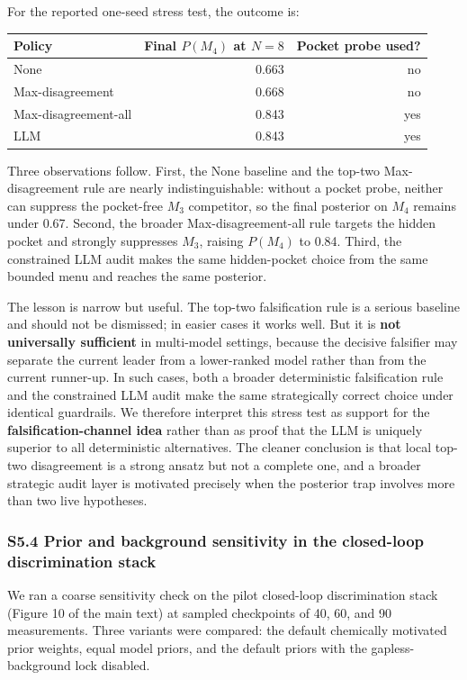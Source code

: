\documentclass[
]{article}
\begin{document}
For the reported one-seed stress test, the outcome is:

\begin{longtable}[]{@{}lrr@{}}
\toprule
\textbf{Policy} & \textbf{Final \(P(M_4)\) at \(N=8\)} & \textbf{Pocket
probe used?}\tabularnewline
\midrule
\endhead
None & 0.663 & no\tabularnewline
Max-disagreement & 0.668 & no\tabularnewline
Max-disagreement-all & 0.843 & yes\tabularnewline
LLM & 0.843 & yes\tabularnewline
\bottomrule
\end{longtable}

Three observations follow. First, the None baseline and the top-two
Max-disagreement rule are nearly indistinguishable: without a pocket
probe, neither can suppress the pocket-free \(M_3\) competitor, so the
final posterior on \(M_4\) remains under 0.67. Second, the broader
Max-disagreement-all rule targets the hidden pocket and strongly
suppresses \(M_3\), raising \(P(M_4)\) to 0.84. Third, the constrained
LLM audit makes the same hidden-pocket choice from the same bounded menu
and reaches the same posterior.

The lesson is narrow but useful. The top-two falsification rule is a
serious baseline and should not be dismissed; in easier cases it works
well. But it is \textbf{not universally sufficient} in multi-model
settings, because the decisive falsifier may separate the current leader
from a lower-ranked model rather than from the current runner-up. In
such cases, both a broader deterministic falsification rule and the
constrained LLM audit make the same strategically correct choice under
identical guardrails. We therefore interpret this stress test as support
for the \textbf{falsification-channel idea} rather than as proof that
the LLM is uniquely superior to all deterministic alternatives. The
cleaner conclusion is that local top-two disagreement is a strong ansatz
but not a complete one, and a broader strategic audit layer is motivated
precisely when the posterior trap involves more than two live
hypotheses.

\hypertarget{s5.4-prior-and-background-sensitivity-in-the-closed-loop-discrimination-stack}{%
\subsubsection{S5.4 Prior and background sensitivity in the closed-loop
discrimination
stack}\label{s5.4-prior-and-background-sensitivity-in-the-closed-loop-discrimination-stack}}

We ran a coarse sensitivity check on the pilot closed-loop
discrimination stack (Figure 10 of the main text) at sampled checkpoints
of 40, 60, and 90 measurements. Three variants were compared: the
default chemically motivated prior weights, equal model priors, and the
default priors with the gapless-background lock disabled.
\end{document}
